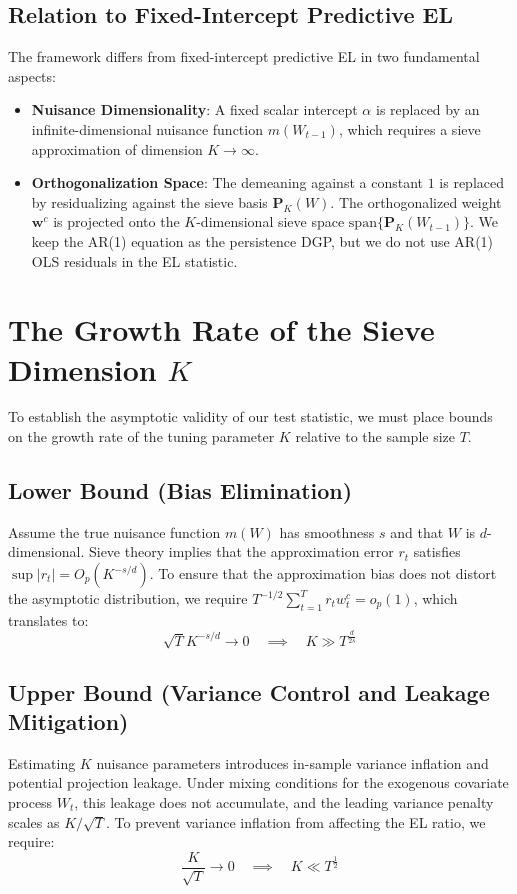 \documentclass{article}
\begin{document}
\subsection{Relation to Fixed-Intercept Predictive EL}

The framework differs from fixed-intercept predictive EL in two fundamental aspects:
\begin{itemize}
    \item \textbf{Nuisance Dimensionality}: A fixed scalar intercept $\alpha$ is replaced by an infinite-dimensional nuisance function $m(W_{t-1})$, which requires a sieve approximation of dimension $K \to \infty$.
    \item \textbf{Orthogonalization Space}: The demeaning against a constant $1$ is replaced by residualizing against the sieve basis $\bm{P}_K(W)$. The orthogonalized weight $\bm{w}^c$ is projected onto the $K$-dimensional sieve space $\text{span}\{\bm{P}_K(W_{t-1})\}$. We keep the AR(1) equation as the persistence DGP, but we do not use AR(1) OLS residuals in the EL statistic.
\end{itemize}

\section{The Growth Rate of the Sieve Dimension $K$}

To establish the asymptotic validity of our test statistic, we must place bounds on the growth rate of the tuning parameter $K$ relative to the sample size $T$.

\subsection{Lower Bound (Bias Elimination)}
Assume the true nuisance function $m(W)$ has smoothness $s$ and that $W$ is $d$-dimensional. Sieve theory implies that the approximation error $r_t$ satisfies $\sup |r_t| = O_p(K^{-s/d})$. To ensure that the approximation bias does not distort the asymptotic distribution, we require $T^{-1/2} \sum_{t=1}^T r_t w^c_t = o_p(1)$, which translates to:
\begin{equation}
    \sqrt{T} K^{-s/d} \to 0 \quad \implies \quad K \gg T^{\frac{d}{2s}}
\end{equation}

\subsection{Upper Bound (Variance Control and Leakage Mitigation)}
Estimating $K$ nuisance parameters introduces in-sample variance inflation and potential projection leakage. Under mixing conditions for the exogenous covariate process $W_t$, this leakage does not accumulate, and the leading variance penalty scales as $K / \sqrt{T}$. To prevent variance inflation from affecting the EL ratio, we require:
\begin{equation}
    \frac{K}{\sqrt{T}} \to 0 \quad \implies \quad K \ll T^{\frac{1}{2}}
\end{equation}
\end{document}
